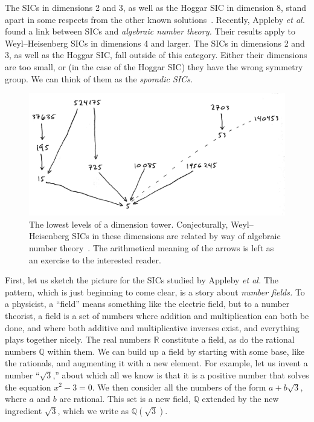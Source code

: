 \documentclass[aps,pra,superscriptaddress,10pt,tightenlines,twocolumn,nofootinbib]{revtex4}
\begin{document}
The SICs in dimensions 2 and 3, as well as the Hoggar SIC in dimension
8, stand apart in some respects from the other known
solutions~\cite{RCF-SIC, stacey-qutrit}.  Recently, Appleby \emph{et
  al.}~\cite{RCF-SIC} found a link between SICs and \emph{algebraic
  number theory.}  Their results apply to Weyl--Heisenberg SICs in
dimensions 4 and larger.  The SICs in dimensions 2 and 3, as well as
the Hoggar SIC, fall outside of this category.  Either their
dimensions are too small, or (in the case of the Hoggar SIC) they have
the wrong symmetry group.  We can think of them as the \emph{sporadic
  SICs.}


\begin{figure}
\begin{center}
\includegraphics[width=12cm]{dimension-tower}
\end{center}
\caption{\label{fig:dimension-tower} The lowest levels of a dimension
  tower.  Conjecturally, Weyl--Heisenberg SICs in these dimensions are
  related by way of algebraic number theory~\cite{RCF-SIC}.  The
  arithmetical meaning of the arrows is left as an exercise to the
  interested reader.}
\end{figure}


First, let us sketch the picture for the SICs studied by Appleby
\emph{et al.}  The pattern, which is just beginning to come clear, is
a story about {\it number fields.}  To a physicist, a ``field'' means
something like the electric field, but to a number theorist, a field
is a set of numbers where addition and multiplication can both be
done, and where both additive and multiplicative inverses exist, and
everything plays together nicely.  The real numbers $\mathbb{R}$
constitute a field, as do the rational numbers $\mathbb{Q}$ within
them.  We can build up a field by starting with some base, like the
rationals, and augmenting it with a new element.  For example, let us
invent a number ``$\sqrt{3}$,'' about which all we know is that it is
a positive number that solves the equation $x^2 - 3 = 0$.  We then
consider all the numbers of the form $a + b\sqrt{3}$, where $a$ and
$b$ are rational.  This set is a new field, $\mathbb{Q}$ extended by
the new ingredient $\sqrt{3}$, which we write as
$\mathbb{Q}(\sqrt{3})$.
\end{document}

